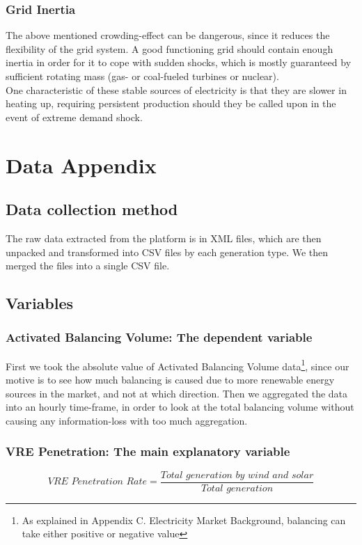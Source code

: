 \documentclass[12pt]{article}
\begin{document}
\begin{appendix}
\subsubsection*{Grid Inertia}\par
The above mentioned crowding-effect can be dangerous, since it reduces the flexibility of the grid system. A good functioning grid should contain enough inertia in order for it to cope with sudden shocks, which is mostly guaranteed by sufficient rotating mass (gas- or coal-fueled turbines or nuclear).\\
One characteristic of these stable sources of electricity is that they are slower in heating up, requiring persistent production should they be called upon in the event of extreme demand shock.\\


\section{Data Appendix}
\label{appendix:Data}
\subsection{Data collection method}
The raw data extracted from the platform is in XML files, which are then unpacked and transformed into CSV files by each generation type. We then merged the files into a single CSV file.\par

\subsection{Variables}
\subsubsection*{Activated Balancing Volume: The dependent variable}
First we took the absolute value of Activated Balancing Volume data\footnote{As explained in Appendix C. Electricity Market Background, balancing can take either positive or negative value}, since our motive is to see how much balancing is caused due to more renewable energy sources in the market, and not at which direction. Then we aggregated the data into an hourly time-frame, in order to look at the total balancing volume without causing any information-loss with too much aggregation.

\subsubsection*{VRE Penetration: The main explanatory variable}
\[\textit{VRE Penetration Rate} = \frac {\textit{Total generation by wind and solar}} {\textit{Total generation}}\]


\end{appendix}
\end{document}
